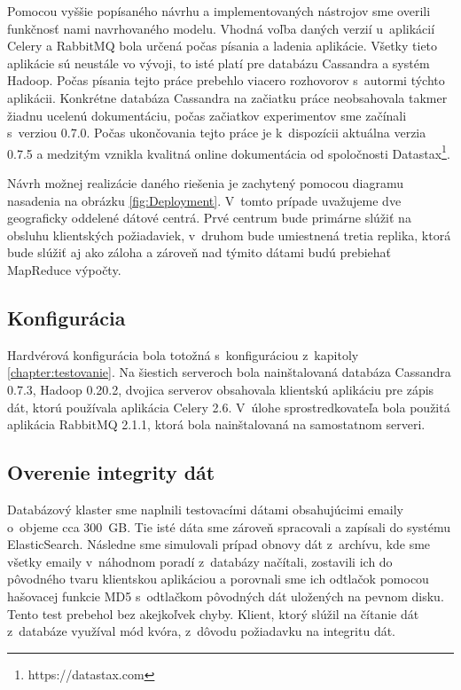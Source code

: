 \documentclass[11pt,twoside,a4paper]{book}
\begin{document}
Pomocou vyššie popísaného návrhu a implementovaných nástrojov sme overili funkčnosť nami navrhovaného modelu. Vhodná voľba daných verzií u~aplikácií Celery a RabbitMQ bola určená počas písania a ladenia aplikácie. Všetky tieto aplikácie sú neustále vo vývoji, to isté platí pre databázu Cassandra a systém Hadoop. Počas písania tejto práce prebehlo viacero rozhovorov s~autormi týchto aplikácii. Konkrétne databáza Cassandra na začiatku práce neobsahovala takmer žiadnu ucelenú dokumentáciu, počas začiatkov experimentov sme začínali s~verziou 0.7.0. Počas ukončovania tejto práce je k~dispozícii aktuálna verzia 0.7.5 a medzitým vznikla kvalitná online dokumentácia od spoločnosti Datastax\footnote{https://datastax.com}. 


Návrh možnej realizácie daného riešenia je zachytený pomocou diagramu nasadenia na obrázku \ref{fig:Deployment}. V~tomto prípade uvažujeme dve geograficky oddelené dátové centrá. Prvé centrum bude primárne slúžiť na obsluhu klientských požiadaviek, v~druhom bude umiestnená tretia replika, ktorá bude slúžiť aj ako záloha a zároveň nad týmito dátami budú prebiehať MapReduce výpočty.

\subsection*{Konfigurácia}
Hardvérová konfigurácia bola totožná s~konfiguráciou z~kapitoly \ref{chapter:testovanie}. Na šiestich serveroch bola nainštalovaná databáza Cassandra 0.7.3, Hadoop 0.20.2, dvojica serverov obsahovala klientskú aplikáciu pre zápis dát, ktorú používala aplikácia Celery 2.6. V~úlohe sprostredkovateľa bola použitá aplikácia RabbitMQ 2.1.1, ktorá bola nainštalovaná na samostatnom serveri.


\subsection*{Overenie integrity dát}
Databázový klaster sme naplnili testovacími dátami obsahujúcimi emaily o~objeme cca 300~GB. Tie isté dáta sme zároveň spracovali a zapísali do systému ElasticSearch. Následne sme simulovali prípad obnovy dát z~archívu, kde sme všetky emaily v~náhodnom poradí z~databázy načítali, zostavili ich do pôvodného tvaru klientskou aplikáciou a porovnali sme ich odtlačok pomocou hašovacej funkcie MD5 s~odtlačkom pôvodných dát uložených na pevnom disku. Tento test prebehol bez akejkoľvek chyby. 
Klient, ktorý slúžil na čítanie dát z~databáze využíval mód kvóra, z~dôvodu požiadavku na integritu dát.
\end{document}
